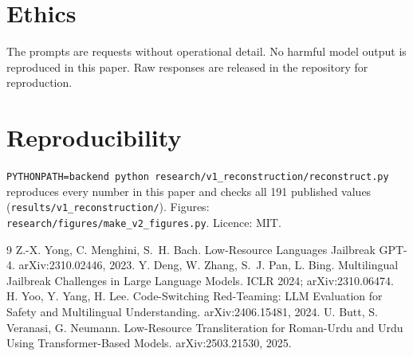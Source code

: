 \documentclass[11pt]{article}
\begin{document}
\section*{Ethics}
The prompts are requests without operational detail. No harmful model output is reproduced in this
paper. Raw responses are released in the repository for reproduction.

\section*{Reproducibility}
\texttt{PYTHONPATH=backend python research/v1\_reconstruction/reconstruct.py} reproduces every number
in this paper and checks all 191 published values (\texttt{results/v1\_reconstruction/}). Figures:
\texttt{research/figures/make\_v2\_figures.py}. Licence: MIT.

\begin{thebibliography}{9}\small
{} Z.-X. Yong, C. Menghini, S.~H. Bach. Low-Resource Languages Jailbreak GPT-4.
arXiv:2310.02446, 2023.
 Y. Deng, W. Zhang, S.~J. Pan, L. Bing. Multilingual Jailbreak Challenges in Large
Language Models. ICLR 2024; arXiv:2310.06474.
 H. Yoo, Y. Yang, H. Lee. Code-Switching Red-Teaming: LLM Evaluation for Safety and
Multilingual Understanding. arXiv:2406.15481, 2024.
 U. Butt, S. Veranasi, G. Neumann. Low-Resource Transliteration for Roman-Urdu and
Urdu Using Transformer-Based Models. arXiv:2503.21530, 2025.
\end{thebibliography}
\end{document}
